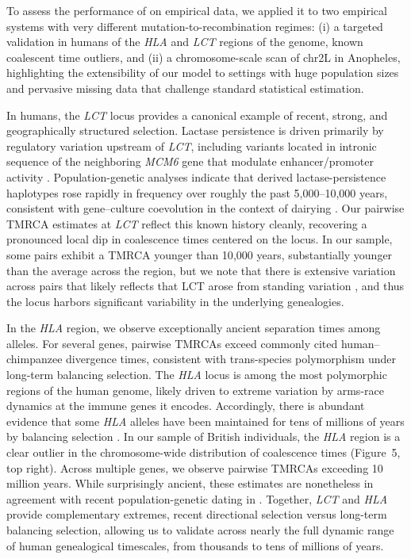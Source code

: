 \documentclass[9pt,twocolumn,twoside]{pnas-new}
\begin{document}
To assess the performance of \cxtkit on empirical data, 
we applied it to two empirical systems with very different mutation-to-recombination regimes:
(i) a targeted validation in humans of the \emph{HLA} and \emph{LCT} regions of the genome, known coalescent time outliers,
and (ii) a chromosome-scale scan of chr2L in Anopheles, 
highlighting the extensibility of our model to settings with huge population sizes
and pervasive missing data that challenge standard statistical estimation.

In humans,
the \emph{LCT} locus provides a canonical example of recent, strong, and geographically structured selection.
Lactase persistence is driven primarily by regulatory variation upstream of \emph{LCT},
including variants located in intronic sequence of the neighboring \emph{MCM6} gene
that modulate enhancer/promoter activity \cite{swallow2003genetics,tishkoff2007convergent}.
Population-genetic analyses indicate that derived lactase-persistence haplotypes rose rapidly in frequency
over roughly the past 5{,}000--10{,}000 years,
consistent with gene--culture coevolution in the context of dairying \cite{bersaglieri2004genetic, itan2009origins}.
Our pairwise TMRCA estimates at \emph{LCT} reflect this known history cleanly,
recovering a pronounced local dip in coalescence times centered on the locus.
In our sample,
some pairs exhibit a TMRCA younger than 10{,}000 years,
substantially younger than the average across the region, 
but we note that there is extensive
variation across pairs that likely reflects that LCT arose from standing variation \cite{peter2012distinguishing},
and thus the locus harbors significant variability in the underlying genealogies. 

In the \emph{HLA} region,
we observe exceptionally ancient separation times among alleles.
For several genes,
pairwise TMRCAs exceed commonly cited human--chimpanzee divergence times,
consistent with trans-species polymorphism under long-term balancing selection.
The \emph{HLA} locus is among the most polymorphic regions of the human genome,
likely driven to extreme variation by arms-race dynamics at the immune genes it encodes.
Accordingly,
there is abundant evidence that some \emph{HLA} alleles have been maintained for tens of millions of years
by balancing selection \cite{hedrick1998balancing,azevedo2015trans,fortier2025ancient}.
In our sample of British individuals,
the \emph{HLA} region is a clear outlier in the chromosome-wide distribution of coalescence times
(Figure~5, top right).
Across multiple genes,
we observe pairwise TMRCAs exceeding 10 million years.
While surprisingly ancient,
these estimates are nonetheless in agreement with recent population-genetic dating in \cite{deng2025general}.
Together, \emph{LCT} and \emph{HLA} provide complementary extremes, 
recent directional selection versus long-term balancing selection, 
allowing us to validate \cxtkit across nearly the full dynamic range of human genealogical timescales,
from thousands to tens of millions of years.
\end{document}
